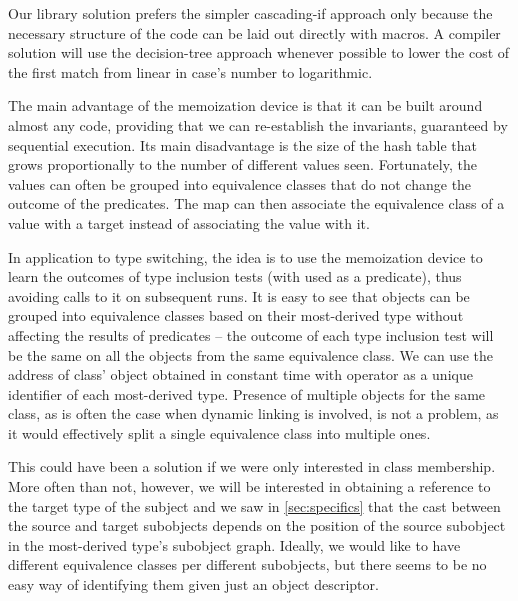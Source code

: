 \noindent
Our library solution prefers the simpler cascading-if approach only because the necessary 
structure of the code can be laid out directly with macros. A compiler solution 
will use the decision-tree approach whenever possible to lower the cost of the 
first match from linear in case's number to logarithmic. %


The main advantage of the memoization device is that it can be built around 
almost any code, providing that we can re-establish the invariants, guaranteed 
by sequential execution. Its main disadvantage is the size of the hash table 
that grows proportionally to the number of different values seen. Fortunately, 
the values can often be grouped into equivalence classes that do not change the 
outcome of the predicates. The map can then associate the equivalence class of a 
value with a target instead of associating the value with it. 

In application to type switching, the idea is to use the memoization device to 
learn the outcomes of type inclusion tests (with  used as a predicate), 
thus avoiding calls to it on subsequent runs. It is easy to see that objects can 
be grouped into equivalence classes based on their most-derived type without 
affecting the results of predicates -- the outcome of each type inclusion test will be the 
same on all the objects from the same equivalence class. We can use the 
address of class'  object obtained in constant time with 
 operator as a unique identifier of each most-derived type. 
Presence of multiple  objects for the same class, as is often 
the case when dynamic linking is involved, is not a problem, as it would 
effectively split a single equivalence class into multiple ones. 

This could have been a solution if we were only interested in class membership. 
More often than not, however, we will be interested in obtaining a reference to 
the target type of the subject and we saw in \textsection\ref{sec:specifics} 
that the cast between the source and target subobjects depends on 
the position of the source subobject in the most-derived type's subobject graph. 
Ideally, we would like to have different equivalence classes per different 
subobjects, but there seems to be no easy way of identifying them given just an 
object descriptor.

